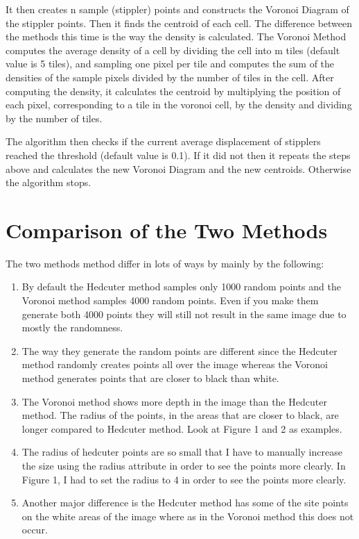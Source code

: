\documentclass[11pt]{article}
\begin{document}
It then creates n sample (stippler) points and constructs the Voronoi Diagram of the stippler points. Then it finds the centroid of each cell. The difference between the methods this time is the way the density is calculated. The Voronoi Method computes the average density of a cell by dividing the cell into m tiles (default value is 5 tiles), and sampling one pixel per tile and computes the sum of the densities of the sample pixels divided by the number of tiles in the cell. After computing the density, it calculates the centroid by multiplying the position of each pixel, corresponding to a tile in the voronoi cell, by the density and dividing by the number of tiles.

The algorithm then checks if the current average displacement of stipplers reached the threshold (default value is 0.1). If it did not then it repeats the steps above and calculates the new Voronoi Diagram and the new centroids. Otherwise the algorithm stops.
\section{Comparison of the Two Methods}

{\setlength\parindent{24pt}The two methods method differ in lots of ways by mainly by the following:
\begin{enumerate}[(1)]
\item By default the Hedcuter method samples only 1000 random points and the Voronoi method samples 4000 random points. Even if you make them generate both 4000 points they will still not result in the same image due to mostly the randomness.
\item The way they generate the random points are different since the Hedcuter method randomly creates points all over the image whereas the Voronoi method generates points that are closer to black than white.
\item The Voronoi method shows more depth in the image than the Hedcuter method. The radius of the points, in the areas that are closer to black, are longer compared to Hedcuter method. Look at Figure 1 and 2 as examples. 
\item The radius of hedcuter points are so small that I have to manually increase the size using the radius attribute in order to see the points more clearly. In Figure 1, I had to set the radius to 4 in order to see the points more clearly.
\item Another major difference is the Hedcuter method has some of the site points on the white areas of the image where as in the Voronoi method this does not occur.
\end{enumerate}}
\end{document}
